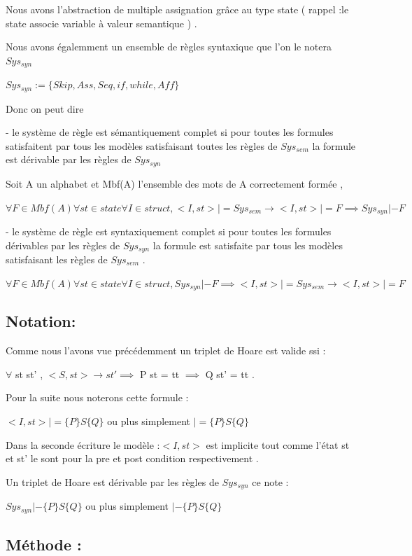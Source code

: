\documentclass{article}
\begin{document}
Nous avons l'abstraction de multiple assignation grâce au type state ( rappel :le state associe variable à valeur semantique ) .

Nous avons égalemment un ensemble de règles syntaxique que l'on le notera $Sys_{syn}$ 

$Sys_{syn} := \{ Skip,Ass,Seq,if,while,Aff\}$



Donc on peut dire 

- le système de règle est sémantiquement complet si pour toutes les formules satisfaitent par tous les modèles satisfaisant toutes les règles de $Sys_{sem}$  la formule est dérivable par les règles de $Sys_{syn}$ 

Soit A un alphabet et Mbf(A) l'ensemble des mots de A correctement formée ,

$\forall F \in Mbf(A) \forall st \in state  \forall I \in struct , <I , st > |= Sys_{sem} \rightarrow  <I,st> |= F \implies Sys_{syn} |- F $

- le système de règle est syntaxiquement complet si pour toutes les formules dérivables par les règles de $Sys_{syn}$  la formule est satisfaite par tous les modèles satisfaisant les règles de $Sys_{sem}$ .


$\forall F \in Mbf(A) \forall st \in state  \forall I \in struct , Sys_{syn} |- F \implies <I , st > |= Sys_{sem} \rightarrow  <I,st> |= F  $


\subsection{ Notation: }
Comme nous l'avons vue précédemment un triplet de Hoare est valide ssi :

$\forall$ st st' , $< S ,st > \rightarrow st' \implies $  P st = tt    $\implies$ Q st' = tt . 

Pour la suite nous noterons cette formule : 

$<I,st> |= \{P\}S\{Q\}$  ou plus simplement $|= \{P\}S\{Q\}$  

Dans la seconde écriture le modèle :$<I,st>$  est implicite tout comme l'état st et st' le sont pour la pre et post condition respectivement . 


Un triplet de Hoare est dérivable par les règles de $Sys_{syn}$ ce note :

$Sys_{syn}|- \{P\}S\{Q\}$  ou plus simplement $|- \{P\}S\{Q\}$ 


\subsection{Méthode :}
\end{document}
